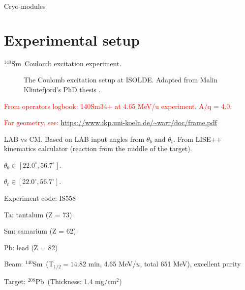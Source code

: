 \documentclass[twoside,english]{uiofysmaster/uiofysmaster}
\newcommand{\Sm}{$^{140}$Sm} %
\newcommand{\Pb}{$^{208}$Pb}
\begin{document}
\bigskip

Cryo-modules

\section{Experimental setup}
\Sm ~Coulomb excitation experiment.


\begin{figure}[ht]
	\centering
	
	\caption{The Coulomb excitation setup at ISOLDE. Adapted from Malin Klintefjord's PhD thesis \cite{Klintefjord}.}
	\label{fig:Coulex}
\end{figure}

\textcolor{red}{From operators logbook: 140Sm34+ at 4.65 MeV/u experiment. A/q = 4.0.}

\begin{table}[ht] 
	\centering 
	
\end{table}
\textcolor{red}{For geometry, see: \url{https://www.ikp.uni-koeln.de/~warr/doc/frame.pdf}}


\begin{table}[ht] 
    \centering 
    \caption{LAB vs CM. Based on LAB input angles from $\theta_b$ and $\theta_t$. From LISE++ kinematics calculator (reaction from the middle of the target).}
	\label{tab:LABvsCM}
    \begin{subtable}{0.45\textwidth}
    		\centering
		\caption{$\theta_b \in [22.0^\circ, 56.7^\circ]$.}
	 	\label{tab:LABvsCM_b}
	 	
	\end{subtable}
	\begin{subtable}{0.45\textwidth}
		\centering
		\caption{$\theta_t \in [22.0^\circ, 56.7^\circ]$.}
		\label{tab:LABvsCM_t}
		
	\end{subtable}
\end{table}



\bigskip

Experiment code: IS558 

Ta: tantalum (Z = 73)

Sm: samarium (Z = 62)

Pb: lead (Z = 82) \newline



Beam: \Sm ~(T$_{1/2} = 14.82$ min, 4.65 MeV/$u$, total 651 MeV), excellent purity

Target: \Pb ~(Thickness: 1.4 mg/cm$^2$)
\end{document}

